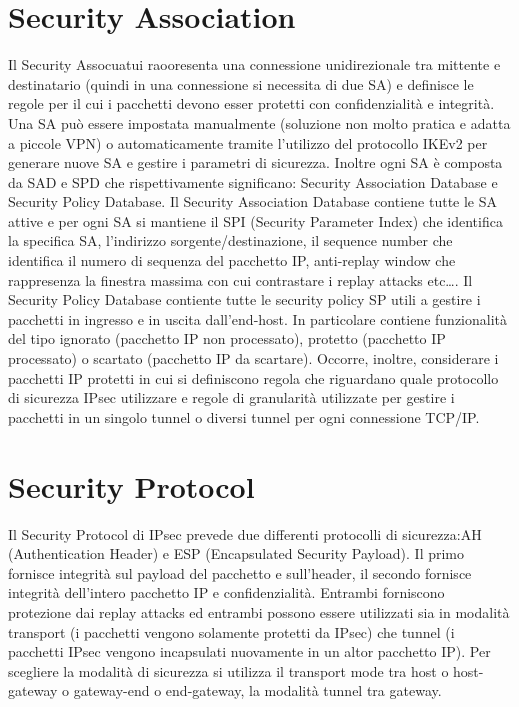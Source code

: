 \documentclass[a4paper,draft]{article}
\begin{document}
\section{Security Association}
Il Security Assocuatui raooresenta una connessione unidirezionale tra mittente e destinatario (quindi in una connessione si necessita di due SA) e definisce le regole per il cui i pacchetti devono esser protetti con confidenzialità e integrità\@. Una SA può essere impostata manualmente (soluzione non molto pratica e adatta a piccole VPN) o automaticamente tramite l'utilizzo del protocollo IKEv2 per generare nuove SA e gestire i parametri di sicurezza\@. Inoltre ogni SA è composta da SAD e SPD che rispettivamente significano: Security Association Database e Security Policy Database\@.\newline
Il Security Association Database contiene tutte le SA attive e per ogni SA si mantiene il SPI (Security Parameter Index) che identifica la specifica SA, l'indirizzo sorgente/destinazione, il sequence number che identifica il numero di sequenza del pacchetto IP, anti-replay window che rappresenza la finestra massima con cui contrastare i replay attacks etc\dots \@.\newline
Il Security Policy Database contiente tutte le security policy SP utili a gestire i pacchetti in ingresso e in uscita dall'end-host\@. In particolare contiene funzionalità del tipo ignorato (pacchetto IP non processato), protetto (pacchetto IP processato) o scartato (pacchetto IP da scartare)\@. Occorre, inoltre, considerare i pacchetti IP protetti in cui si definiscono regola che riguardano quale protocollo di sicurezza IPsec utilizzare e regole di granularità utilizzate per gestire i pacchetti in un singolo tunnel o diversi tunnel per ogni connessione TCP/IP\@.
\section{Security Protocol}
Il Security Protocol di IPsec prevede due differenti protocolli di sicurezza:AH (Authentication Header) e ESP (Encapsulated Security Payload)\@. Il primo fornisce integrità sul payload del pacchetto e sull'header, il secondo fornisce integrità dell'intero pacchetto IP e confidenzialità\@.\newline
Entrambi forniscono protezione dai replay attacks ed entrambi possono essere utilizzati sia in modalità transport (i pacchetti vengono solamente protetti da IPsec) che tunnel (i pacchetti IPsec vengono incapsulati nuovamente in un altor pacchetto IP)\@. Per scegliere la modalità di sicurezza si utilizza il transport mode tra host o host-gateway o gateway-end o end-gateway, la modalità tunnel tra gateway\@.
\end{document}
